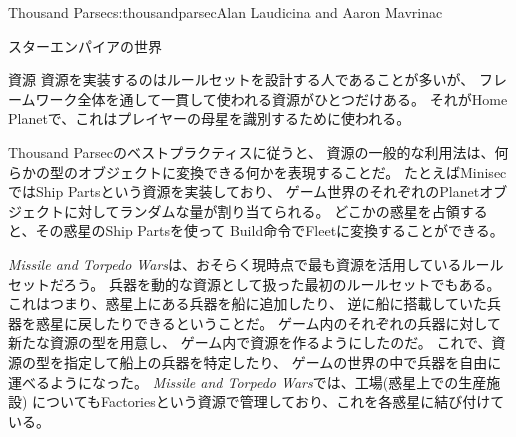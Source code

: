 \begin{aosachapter}{Thousand Parsec}{s:thousandparsec}{Alan Laudicina and Aaron Mavrinac}
\begin{aosasect1}{スターエンパイアの世界}
\begin{aosasect2}{資源}
資源を実装するのはルールセットを設計する人であることが多いが、
フレームワーク全体を通して一貫して使われる資源がひとつだけある。
それがHome Planetで、これはプレイヤーの母星を識別するために使われる。

Thousand Parsecのベストプラクティスに従うと、
資源の一般的な利用法は、何らかの型のオブジェクトに変換できる何かを表現することだ。
たとえばMinisecではShip Partsという資源を実装しており、
ゲーム世界のそれぞれのPlanetオブジェクトに対してランダムな量が割り当てられる。
どこかの惑星を占領すると、その惑星のShip Partsを使って
Build命令でFleetに変換することができる。

\emph{Missile and Torpedo Wars}は、おそらく現時点で最も資源を活用しているルールセットだろう。
兵器を動的な資源として扱った最初のルールセットでもある。
これはつまり、惑星上にある兵器を船に追加したり、
逆に船に搭載していた兵器を惑星に戻したりできるということだ。
ゲーム内のそれぞれの兵器に対して新たな資源の型を用意し、
ゲーム内で資源を作るようにしたのだ。
これで、資源の型を指定して船上の兵器を特定したり、
ゲームの世界の中で兵器を自由に運べるようになった。
\emph{Missile and Torpedo Wars}では、工場(惑星上での生産施設)
についてもFactoriesという資源で管理しており、これを各惑星に結び付けている。

\end{aosasect2}


\end{aosasect1}
\end{aosachapter}
